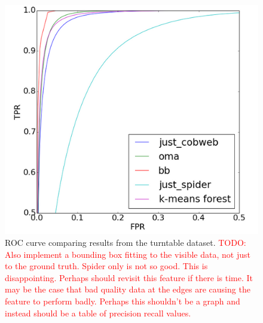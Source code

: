 \documentclass[10pt,twocolumn,letterpaper]{article}
\newcommand{\todo}[1]{\textcolor{red}{TODO: #1}}
\begin{document}
\begin{figure}[bt]
  \centering 
  \includegraphics[width=0.9\columnwidth]{roc_curve.png}
  \caption{ROC curve comparing results from the turntable dataset. 
  \todo{Also implement a bounding box fitting to the visible data, not just to the ground truth. Spider only is not so good. This is disappointing. Perhaps should revisit this feature if there is time. It may be the case that bad quality data at the edges are causing the feature to perform badly. Perhaps this shouldn't be a graph and instead should be a table of precision recall values.}
  }
  \label{fig:bigbird_roc}
\end{figure}


\end{document}
